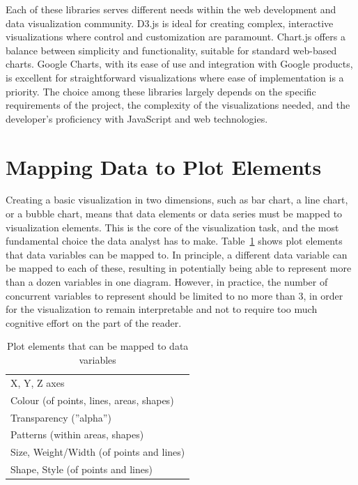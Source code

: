 Each of these libraries serves different needs within the web development and data visualization community. D3.js is ideal for creating complex, interactive visualizations where control and customization are paramount. Chart.js offers a balance between simplicity and functionality, suitable for standard web-based charts. Google Charts, with its ease of use and integration with Google products, is excellent for straightforward visualizations where ease of implementation is a priority. The choice among these libraries largely depends on the specific requirements of the project, the complexity of the visualizations needed, and the developer's proficiency with JavaScript and web technologies.

\section{Mapping Data to Plot Elements}

Creating a basic visualization in two dimensions, such as  bar chart, a line chart, or a bubble chart, means that data elements or data series must be mapped to visualization elements. This is the core of the visualization task, and the most fundamental choice the data analyst has to make. Table~\ref{tab:elements} shows plot elements that data variables can be mapped to. In principle, a different data variable can be mapped to each of these, resulting in potentially being able to represent more than a dozen variables in one diagram. However, in practice, the number of concurrent variables to represent should be limited to no more than 3, in order for the visualization to remain interpretable and not to require too much cognitive effort on the part of the reader.

\begin{table}[h]
\centering
\renewcommand{\arraystretch}{1.25}

\begin{tabular}{l} \hline
X, Y, Z axes \\
Colour (of points, lines, areas, shapes) \\ 
Transparency (''alpha'') \\
Patterns (within areas, shapes) \\
Size, Weight/Width (of points and lines) \\
Shape, Style (of points and lines) \\ \hline
\end{tabular}
\caption{Plot elements that can be mapped to data variables}
\label{tab:elements}
\end{table}

